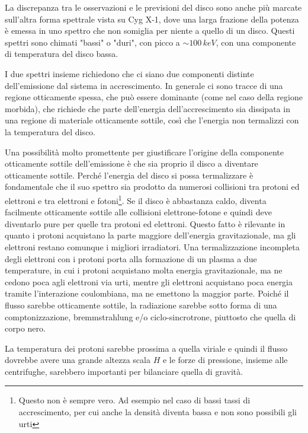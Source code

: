 \documentclass[a4paperbi]{article}
\begin{document}
La discrepanza tra le osservazioni e le previsioni del disco sono anche più marcate sull'altra forma spettrale vista su Cyg X-1, dove una larga frazione della potenza è emessa in uno spettro che non somiglia per niente a quello di un disco. Questi spettri sono chimati "bassi" o "duri", con picco a $\sim100\,keV$, con una componente di temperatura del disco bassa.

I due spettri insieme richiedono che ci siano due componenti distinte dell'emissione dal sistema in accrescimento. In generale ci sono tracce di una regione otticamente spessa, che può essere dominante (come nel caso della regione morbida), che richiede che parte dell'energia dell'accrescimento sia dissipata in una regione di materiale otticamente sottile, così che l'energia non termalizzi con la temperatura del disco.

	Una possibilità molto promettente per giustificare l'origine della componente otticamente sottile dell'emissione è che sia proprio il disco a diventare otticamente sottile. Perché l'energia del disco si possa termalizzare è fondamentale che il suo spettro sia prodotto da numerosi collisioni tra protoni ed elettroni e tra elettroni e fotoni\footnote{Questo non è sempre vero. Ad esempio nel caso di bassi tassi di accrescimento, per cui anche la densità diventa bassa e non sono possibili gli urti}. Se il disco è abbastanza caldo, diventa facilmente otticamente sottile alle collisioni elettrone-fotone e quindi deve diventarlo pure per quelle tra protoni ed elettroni. Questo fatto è rilevante in quanto i protoni acquistano la parte maggiore dell'energia gravitazionale, ma gli elettroni restano comunque i migliori irradiatori. Una termalizzazione incompleta degli elettroni con i protoni porta alla formazione di un plasma a due temperature, in cui i protoni acquistano molta energia gravitazionale, ma ne cedono poca agli elettroni via urti, mentre gli elettroni acquistano poca energia tramite l'interazione coulombiana, ma ne emettono la maggior parte.
	Poiché il flusso sarebbe otticamente sottile, la radiazione sarebbe sotto forma di una comptonizzazione, bremmstrahlung e/o ciclo-sincrotrone, piuttosto che quella di corpo nero.
	
	La temperatura dei protoni sarebbe prossima a quella viriale e quindi il flusso dovrebbe avere una grande altezza scala $H$ e le forze di pressione, insieme alle centrifughe, sarebbero importanti per bilanciare quella di gravità.
	
\end{document}
